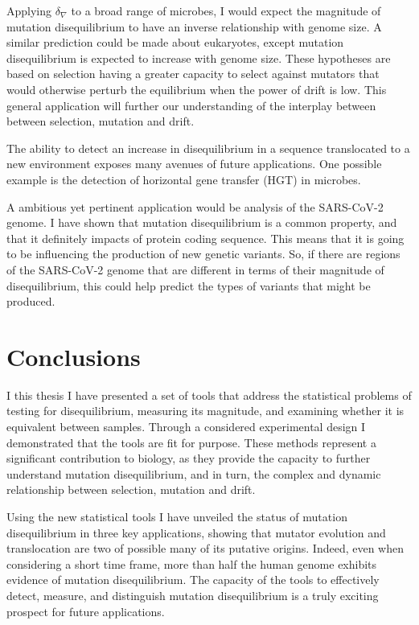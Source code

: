 Applying $\delta_\nabla$ to a broad range of microbes, I would expect the magnitude of mutation disequilibrium to have an inverse relationship with genome size. A similar prediction could be made about eukaryotes, except mutation disequilibrium is expected to increase with genome size. These hypotheses are based on selection having a greater capacity to select against mutators that would otherwise perturb the equilibrium when the power of drift is low. This general application will further our understanding of the interplay between between selection, mutation and drift. 
  
The ability to detect an increase in disequilibrium in a sequence translocated to a new environment exposes many avenues of future applications. One possible example is the detection of horizontal gene transfer (HGT) in microbes. 

A ambitious yet pertinent application would be analysis of the SARS-CoV-2 genome. I have shown that mutation disequilibrium is a common property, and that it definitely impacts of protein coding sequence. This means that it is going to be influencing the production of new genetic variants. So, if there are regions of the SARS-CoV-2 genome that are different in terms of their magnitude of disequilibrium, this could help predict the types of variants that might be produced. 

\section{Conclusions}

I this thesis I have presented a set of tools that address the statistical problems of testing for disequilibrium, measuring its magnitude, and examining whether it is equivalent between samples. Through a considered experimental design I demonstrated that the tools are fit for purpose. These methods represent a significant contribution to biology, as they provide the capacity to further understand mutation disequilibrium, and in turn, the complex and dynamic relationship between selection, mutation and drift. 

Using the new statistical tools I have unveiled the status of mutation disequilibrium in three key applications, showing that mutator evolution and translocation are two of possible many of its putative origins. Indeed, even when considering a short time frame, more than half the human genome exhibits evidence of mutation disequilibrium. The capacity of the tools to effectively detect, measure, and distinguish mutation disequilibrium is a truly exciting prospect for future applications. 
